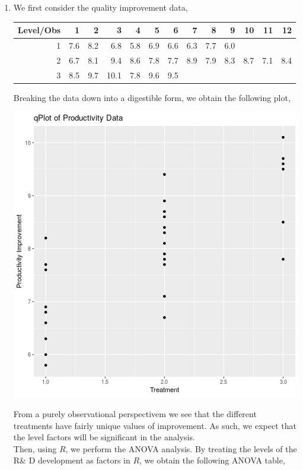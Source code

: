 \documentclass[letterpaper,10pt]{article}
\begin{document}
\begin{enumerate}
\item We first consider the quality improvement data,
\begin{center}
\begin{tabular}{|r|rrrrrrrrrrrr|}
\hline
Level/Obs & 1 & 2 & 3 & 4 & 5 & 6 & 7 & 8 & 9 & 10 & 11 & 12\\\hline
1 & 7.6 & 8.2 & 6.8 & 5.8 & 6.9 & 6.6 & 6.3 & 7.7 & 6.0 &&& \\\hline
2 & 6.7 & 8.1 & 9.4 & 8.6 & 7.8 & 7.7 & 8.9 & 7.9 & 8.3 & 8.7 & 7.1 & 8.4\\\hline
3 & 8.5 & 9.7 & 10.1 & 7.8 & 9.6 & 9.5 &&&&&&\\\hline
\end{tabular}
\end{center}
Breaking the data down into a digestible form, we obtain the following plot,
\begin{center}
\includegraphics[scale=.75]{prodq.png}
\end{center}
From a purely observational perspectivem we see that the different treatments have fairly unique values of improvement. As such, we expect that the level factors will be significant in the analysis.\\
Then, using $R$, we perform the ANOVA analysis. By treating the levels of the R\& D development as factors in $R$, we obtain the following ANOVA table,

\end{enumerate}
\end{document}
